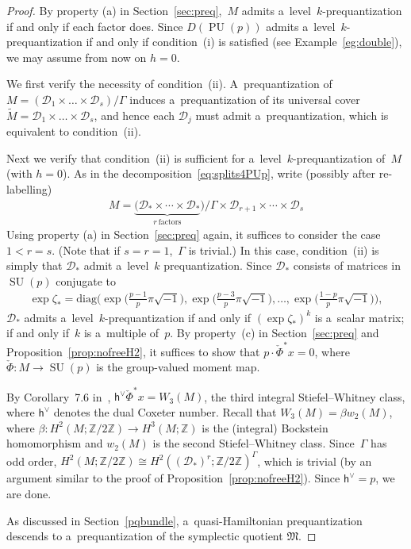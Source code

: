 \documentclass[pdftex]{sigma}
\numberwithin{equation}{section}
\DeclareMathOperator{\SU}{SU}
\DeclareMathOperator{\PU}{PU}
\begin{document}
\begin{proof}
By property (a) in Section~\ref{sec:preq},~$M$ admits a~level~$k$-prequantization if and only if each factor does.
Since $D(\PU(p))$ admits a~level~$k$-prequantization if and only if condition~(i) %
is satisf\/ied (see Example~\ref{eg:double}), we may assume from now on $h=0$.

We f\/irst verify the necessity of condition~(ii). %
A~prequantization of $M=(\mathcal{D}_1 \times \dots \times \mathcal{D}_s) /\Gamma$ induces a~prequantization of its
universal cover $\tilde{M}=\mathcal{D}_1 \times \dots \times \mathcal{D}_s$, and hence each $\mathcal{D}_j$ must admit
a~prequantization, which is equivalent to condition~(ii). %

Next we verify that condition~(ii) %
is suf\/f\/icient for a~level~$k$-prequantization of~$M$ (with $h=0$).
As in the decomposition~\eqref{eq:splits4PUp}, write (possibly after re-labelling)
\begin{gather*}
M=\underbrace{(\mathcal{D}_* \times \cdots \times \mathcal{D}_*}_{r~\text{factors}})/\Gamma \times \mathcal{D}_{r+1}
\times \cdots \times \mathcal{D}_s
\end{gather*}
Using property (a) in Section~\ref{sec:preq} again, it suf\/f\/ices to consider the case $1<r=s$.
(Note that if $s=r=1$,~$\Gamma$ is trivial.) In this case, condition~(ii) %
is simply that $\mathcal{D}_*$ admit a~level~$k$ prequantization.
Since $\mathcal{D}_*$ consists of matrices in $\SU(p)$ conjugate to
\begin{gather*}
\exp \zeta_* = \mathrm{diag}\big(\exp\big(\tfrac{p-1}{p}\pi\sqrt{-1}\big), \exp\big(\tfrac{p-3}{p}\pi\sqrt{-1}\big), \dots,
\exp\big(\tfrac{1-p}{p}\pi\sqrt{-1}\big)\big),
\end{gather*}
$\mathcal{D}_*$ admits a~level~$k$-prequantization if and only if $(\exp \zeta_*)^k$ is a~scalar matrix; if and only
if~$k$ is a~multiple of~$p$.
By property~(c) in Section~\ref{sec:preq} and Proposition~\ref{prop:nofreeH2}, it suf\/f\/ices to show that
$p\cdot\check{\Phi}^*x =0$, where $\check{\Phi}:M\to \SU(p)$ is the group-valued moment map.

By Corollary~7.6 in~\cite{AM}, $\mathsf{h}^\vee \check{\Phi}^*x=W_3(M)$, the third integral Stiefel--Whitney class, where
$\mathsf{h}^\vee$ denotes the dual Coxeter number.
Recall that $W_3(M)=\beta w_2(M)$, where $\beta: H^2(M;{\mathbb{Z}}/2{\mathbb{Z}}) \to H^3(M;{\mathbb{Z}})$ is the
(integral) Bockstein homomorphism and $w_2(M)$ is the second Stiefel--Whitney class.
Since~$\Gamma$ has odd order, $H^2(M;{\mathbb{Z}}/2{\mathbb{Z}}) \cong
H^2((\mathcal{D}_*)^r;{\mathbb{Z}}/2{\mathbb{Z}})^\Gamma$, which is trivial (by an argument similar to the proof of
Proposition~\ref{prop:nofreeH2}).
Since $\mathsf{h}^\vee=p$, we are done.

As discussed in Section~\ref{pqbundle}, a~quasi-Hamiltonian prequantization descends to a~prequantization of the
symplectic quotient $\mathfrak{M}$.
\end{proof}
\end{document}
